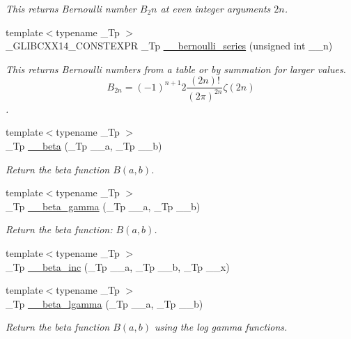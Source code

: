 \begin{DoxyCompactItemize}
\begin{DoxyCompactList}\small\item\em This returns Bernoulli number $ B_2n $ at even integer arguments $ 2n $. \end{DoxyCompactList}\item 
{\footnotesize template$<$typename \+\_\+\+Tp $>$ }\\\+\_\+\+G\+L\+I\+B\+C\+X\+X14\+\_\+\+C\+O\+N\+S\+T\+E\+X\+PR \+\_\+\+Tp \hyperlink{namespacestd_1_1____detail_ad3d3e44d340742b0362a8ad95080d315}{\+\_\+\+\_\+bernoulli\+\_\+series} (unsigned int \+\_\+\+\_\+n)
\begin{DoxyCompactList}\small\item\em This returns Bernoulli numbers from a table or by summation for larger values. \[ B_{2n} = (-1)^{n+1} 2\frac{(2n)!}{(2\pi)^{2n}} \zeta(2n) \]. \end{DoxyCompactList}\item 
{\footnotesize template$<$typename \+\_\+\+Tp $>$ }\\\+\_\+\+Tp \hyperlink{namespacestd_1_1____detail_a090d2f0920e0d208c467609b2a81d717}{\+\_\+\+\_\+beta} (\+\_\+\+Tp \+\_\+\+\_\+a, \+\_\+\+Tp \+\_\+\+\_\+b)
\begin{DoxyCompactList}\small\item\em Return the beta function $ B(a,b) $. \end{DoxyCompactList}\item 
{\footnotesize template$<$typename \+\_\+\+Tp $>$ }\\\+\_\+\+Tp \hyperlink{namespacestd_1_1____detail_a93cfa67cc3f14564925ed3153e055cd1}{\+\_\+\+\_\+beta\+\_\+gamma} (\+\_\+\+Tp \+\_\+\+\_\+a, \+\_\+\+Tp \+\_\+\+\_\+b)
\begin{DoxyCompactList}\small\item\em Return the beta function\+: $ B(a,b) $. \end{DoxyCompactList}\item 
{\footnotesize template$<$typename \+\_\+\+Tp $>$ }\\\+\_\+\+Tp \hyperlink{namespacestd_1_1____detail_aedfe43a9c0065cc3883df50536a625e4}{\+\_\+\+\_\+beta\+\_\+inc} (\+\_\+\+Tp \+\_\+\+\_\+a, \+\_\+\+Tp \+\_\+\+\_\+b, \+\_\+\+Tp \+\_\+\+\_\+x)
\item 
{\footnotesize template$<$typename \+\_\+\+Tp $>$ }\\\+\_\+\+Tp \hyperlink{namespacestd_1_1____detail_ac4f233100713779d93e4eee7665bd0a5}{\+\_\+\+\_\+beta\+\_\+lgamma} (\+\_\+\+Tp \+\_\+\+\_\+a, \+\_\+\+Tp \+\_\+\+\_\+b)
\begin{DoxyCompactList}\small\item\em Return the beta function $B(a,b)$ using the log gamma functions. \end{DoxyCompactList}\item 

\end{DoxyCompactItemize}
